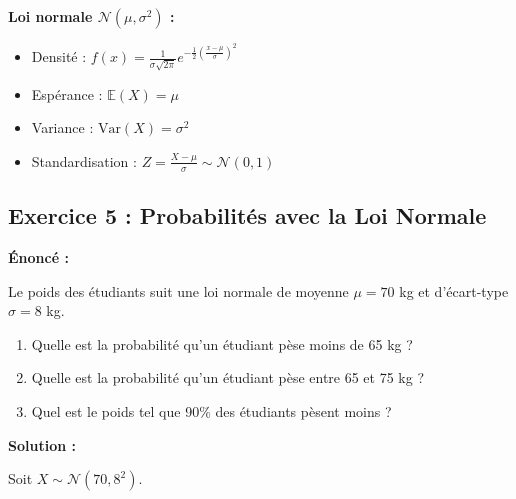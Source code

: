 \documentclass[11pt,a4paper]{article}
\newcommand{\Var}{\text{Var}}
\newcommand{\E}{\mathbb{E}}
\begin{document}
\begin{rappelbox}
\textbf{Loi normale $\mathcal{N}(\mu, \sigma^2)$ :}
\begin{itemize}
    \item Densité : $f(x) = \frac{1}{\sigma\sqrt{2\pi}} e^{-\frac{1}{2}\left(\frac{x-\mu}{\sigma}\right)^2}$
    \item Espérance : $\E(X) = \mu$
    \item Variance : $\Var(X) = \sigma^2$
    \item Standardisation : $Z = \frac{X - \mu}{\sigma} \sim \mathcal{N}(0, 1)$
\end{itemize}
\end{rappelbox}

\subsection{Exercice 5 : Probabilités avec la Loi Normale}

\textbf{Énoncé :}

Le poids des étudiants suit une loi normale de moyenne $\mu = 70$ kg et d'écart-type $\sigma = 8$ kg.

\begin{enumerate}
    \item Quelle est la probabilité qu'un étudiant pèse moins de 65 kg ?
    \item Quelle est la probabilité qu'un étudiant pèse entre 65 et 75 kg ?
    \item Quel est le poids tel que 90\% des étudiants pèsent moins ?
\end{enumerate}

\textbf{Solution :}

Soit $X \sim \mathcal{N}(70, 8^2)$.
\end{document}
